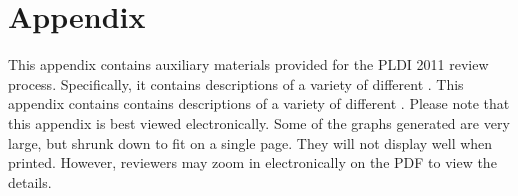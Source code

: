 \ifanon



% 
% 





\fi

\section{Appendix}
\ifanon
This appendix contains auxiliary materials provided for the PLDI 2011
review process. Specifically, it contains \forest{} descriptions of a
variety of different \filestores{}.
\else
This appendix contains contains \forest{} descriptions of a
variety of different \filestores{}.
\fi
Please note that this appendix is best viewed electronically.  Some of
the graphs generated are very large, but shrunk down to fit on a
single page.  They will not display well when
printed.  However, reviewers may zoom in electronically
on the PDF to view the details.


